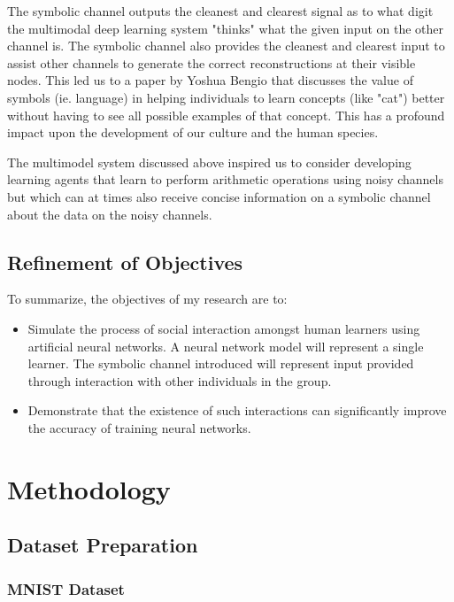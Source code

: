 \documentclass{article}
\begin{document}
	The symbolic channel outputs the cleanest and clearest signal as to what digit the multimodal deep learning system "thinks" what the given input on the other channel is. The symbolic channel also provides the cleanest and clearest input to assist other channels to generate the correct reconstructions at their visible nodes. This led us to a paper by Yoshua Bengio\cite{DBLP:journals/corr/abs-1203-2990} that discusses the value of symbols (ie. language) in helping individuals to learn concepts (like "cat") better without having to see all possible examples of that concept. This has a profound impact upon the development of our culture and the human species. 
	
	The multimodel system discussed above inspired us to consider developing learning agents that learn to perform arithmetic operations using noisy channels but which can at times also receive concise information on a symbolic channel about the data on the noisy channels.
	
	\subsection{Refinement of Objectives}
	
	To summarize, the objectives of my research are to:
	
	\begin{itemize}
		\item Simulate the process of social interaction amongst human learners using artificial neural networks. A neural network model will represent a single learner. The symbolic channel introduced will represent input provided through interaction with other individuals in the group.
		\item Demonstrate that the existence of such interactions can significantly improve the accuracy of training neural networks.
	\end{itemize}
	
	\section{Methodology} \label{sec:methodology}
	
	\subsection{Dataset Preparation}
	
	\subsubsection{MNIST Dataset}
	
\end{document}
